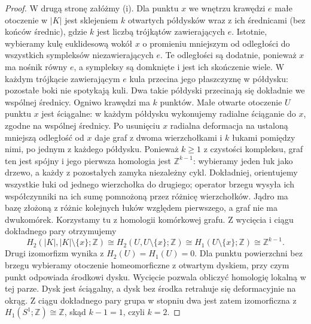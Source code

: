 \begin{proof}
W drugą stronę załóżmy (i). Dla punktu $x$ we wnętrzu
krawędzi $e$ małe otoczenie w $|K|$ jest sklejeniem
$k$ otwartych półdysków wraz z ich średnicami (bez
końców średnic), gdzie $k$ jest liczbą trójkątów
zawierających $e$. Istotnie, wybieramy kulę euklidesową
wokół $x$ o promieniu mniejszym od odległości do wszystkich
sympleksów niezawierających $e$. Te odległości są dodatnie,
ponieważ $x$ ma nośnik równy $e$, a sympleksy są domknięte
i jest ich skończenie wiele. W każdym trójkącie zawierającym
$e$ kula przecina jego płaszczyznę w półdysku: pozostałe
boki nie spotykają kuli. Dwa takie półdyski przecinają się
dokładnie we wspólnej średnicy. Ogniwo krawędzi ma $k$
punktów. Małe otwarte otoczenie $U$ punktu $x$ jest ściągalne:
w każdym półdysku wykonujemy radialne ściąganie do $x$,
zgodne na wspólnej średnicy. Po usunięciu $x$ radialna
deformacja na ustaloną mniejszą odległość od $x$ daje
graf z dwoma wierzchołkami i $k$ łukami pomiędzy nimi,
po jednym z każdego półdysku. Ponieważ $k\ge1$ z czystości
kompleksu, graf ten jest spójny i jego pierwsza homologia
jest $\mathbb Z^{k-1}$: wybieramy jeden łuk jako drzewo,
a każdy z pozostałych zamyka niezależny cykl.
Dokładniej, orientujemy wszystkie łuki od jednego
wierzchołka do drugiego; operator brzegu wysyła ich
współczynniki na ich sumę pomnożoną przez różnicę
wierzchołków. Jądro ma bazę złożoną z różnic kolejnych
łuków względem pierwszego, a graf nie ma dwukomórek.
Korzystamy tu z homologii komórkowej grafu.
Z wycięcia i ciągu dokładnego pary otrzymujemy
\[
H_2(|K|,|K|\setminus\{x\};\mathbb Z)
\cong H_2(U,U\setminus\{x\};\mathbb Z)
\cong H_1(U\setminus\{x\};\mathbb Z)
\cong \mathbb Z^{k-1}.
\]
Drugi izomorfizm wynika z $H_2(U)=H_1(U)=0$.
Dla punktu powierzchni bez brzegu wybieramy
otoczenie homeomorficzne z otwartym dyskiem,
przy czym punkt odpowiada środkowi dysku.
Wycięcie pozwala obliczyć homologię lokalną
w tej parze. Dysk jest ściągalny, a dysk
bez środka retrahuje się deformacyjnie na okrąg.
Z ciągu dokładnego pary grupa w stopniu dwa
jest zatem izomorficzna z $H_1(S^1;\mathbb Z)
\cong\mathbb Z$, skąd $k-1=1$, czyli $k=2$.


\end{proof}
